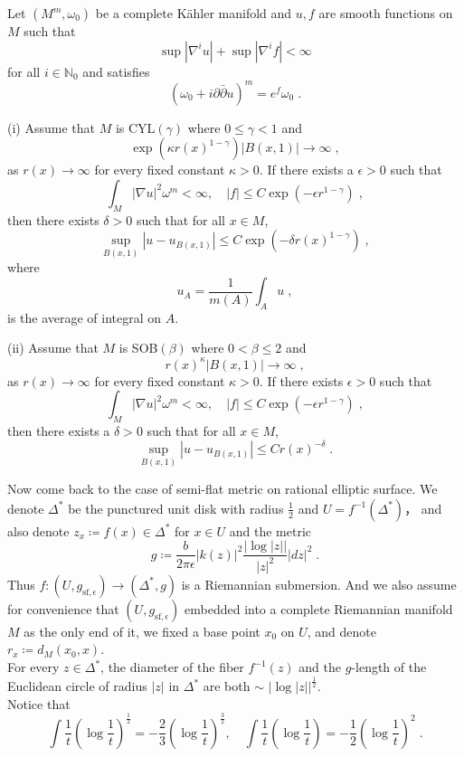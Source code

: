 \begin{proposition}
Let $(M^m,\omega_0)$ be a complete K{\"a}hler manifold and $u,f$ are smooth functions on $M $ such that
\[ \sup|\nabla^i u|+\sup|\nabla^i f|<\infty   \]
for all $i\in\mathbb{N}_0$ and satisfies
\[ (\omega_0+i\partial\bar{\partial}u)^m=e^f\omega_0\; . \]

(i) Assume that $M$ is CYL$(\gamma)$ where $0\leq \gamma<1$ and
\[ \exp(\kappa r(x)^{1-\gamma})|B(x,1)|\rightarrow\infty\; , \]
as $r(x)\rightarrow\infty$ for every fixed constant $\kappa>0$. If there exists a $\epsilon>0$ such that
\[ \int_M|\nabla u|^2\omega^m <\infty,\quad |f|\leq C\exp(-\epsilon r^{1-\gamma})\; , \]
then there exists $\delta>0$ such that for all $x\in M$,
\[ \sup_{B(x,1)}|u-u_{B(x,1)}|\leq C\exp(-\delta r(x)^{1-\gamma}) \; , \]
where \[ u_{A}=\frac{1}{m(A)}\int_A u \; , \]
is the average of integral on $A$.\\ \indent

(ii) Assume that $M$ is SOB$(\beta)$ where $0< \beta\leq 2$ and
\[ r(x)^\kappa |B(x,1)|\rightarrow\infty\; , \]
as $r(x)\rightarrow\infty$ for every fixed constant $\kappa>0$. If there exists $\epsilon>0$ such that
\[ \int_M|\nabla u|^2\omega^m<\infty,\quad |f|\leq C\exp(-\epsilon r^{1-\gamma})\; , \]
then there exists a $\delta>0$ such that for all $x\in M$,
\[ \sup_{B(x,1)}|u-u_{B(x,1)}|\leq Cr(x)^{-\delta} \; . \]
\end{proposition}
Now come back to the case of semi-flat metric on rational elliptic surface. We denote $\Delta^*$ be the punctured unit disk with radius $\frac{1}{2}$ and $U=f^{-1}(\Delta^*)$， and also denote $z_x\coloneq f(x)\in\Delta^*$ for $x\in U$ and the metric
\[ g\coloneq \frac{b}{2\pi \epsilon}|k(z)|^2\frac{|\log|z||}{|z|^2}|dz|^2\; . \]
\indent Thus $f\colon(U,g_{\mathrm{sf},\epsilon})\rightarrow(\Delta^*,g)$ is a Riemannian submersion. And we also assume for convenience that $(U,g_{\mathrm{sf},\epsilon})$ embedded into a complete Riemannian manifold $M$ as the only end of it, we fixed a base point $x_0$ on $U$, and denote $r_x\coloneq d_M(x_0,x)$.\\ \indent
For every $z\in\Delta^*$, the diameter of the fiber $f^{-1}(z)$ and the $g$-length of the Euclidean circle of radius $|z|$ in $\Delta^*$ are both $\sim$ $|\log|z||^{\frac{1}{2}  }$.\\ \indent
Notice that
\[ \int \frac{1}{t}\left(\log \frac{1}{t}\right)^{\frac{1}{2}}=-\frac{2}{3}\left(\log \frac{1}{t} \right)^{\frac{3}{2} },\quad \int \frac{1}{t}\left(\log \frac{1}{t}\right)=-\frac{1}{2}\left(\log \frac{1}{t} \right)^{2}\; .  \]
